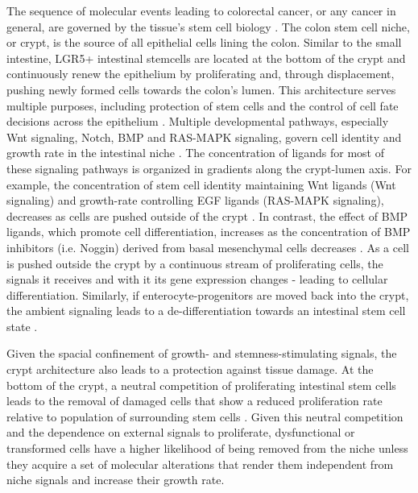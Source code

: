 \begin{flushleft}
The sequence of molecular events leading to colorectal cancer, or any cancer in general, are governed by the tissue's stem cell biology \cite{CleversCancerStemCell}. The colon stem cell niche, or crypt, is the source of all epithelial cells lining the colon. Similar to the small intestine, LGR5+ intestinal stemcells are located at the bottom of the crypt and continuously renew the epithelium by proliferating and, through displacement, pushing newly formed cells towards the colon's lumen. This architecture serves multiple purposes, including protection of stem cells and the control of cell fate decisions across the epithelium \cite{cleversIntestinalCryptPrototype2013a}. Multiple developmental pathways, especially Wnt signaling, Notch, BMP and RAS-MAPK signaling, govern cell identity and growth rate in the intestinal niche \cite{Gehart2019}. The concentration of ligands for most of these signaling pathways is organized in gradients along the crypt-lumen axis. For example, the concentration of stem cell identity maintaining Wnt ligands (Wnt signaling) and growth-rate controlling EGF ligands (RAS-MAPK signaling), decreases as cells are pushed outside of the crypt \cite{Sasaki2016}. In contrast, the effect of BMP ligands, which promote cell differentiation, increases as the concentration of BMP inhibitors (i.e. Noggin) derived from basal mesenchymal cells decreases \cite{heBMPSignalingInhibits2004}. As a cell is pushed outside the crypt by a continuous stream of proliferating cells, the signals it receives and with it its gene expression changes - leading to cellular differentiation. Similarly, if enterocyte-progenitors are moved back into the crypt, the ambient signaling leads to a de-differentiation towards an intestinal stem cell state \cite{tettehReplacementLostLgr5Positive2016a}. \par

Given the spacial confinement of growth- and stemness-stimulating signals, the crypt architecture also leads to a protection against tissue damage. At the bottom of the crypt, a neutral competition of proliferating intestinal stem cells leads to the removal of damaged cells that show a reduced proliferation rate relative to population of surrounding stem cells \cite{snippertIntestinalCryptHomeostasis2010a}. Given this neutral competition and the dependence on external signals to proliferate, dysfunctional or transformed cells have a higher likelihood of being removed from the niche unless they acquire a set of molecular alterations that render them independent from niche signals and increase their growth rate. \par


\end{flushleft}

